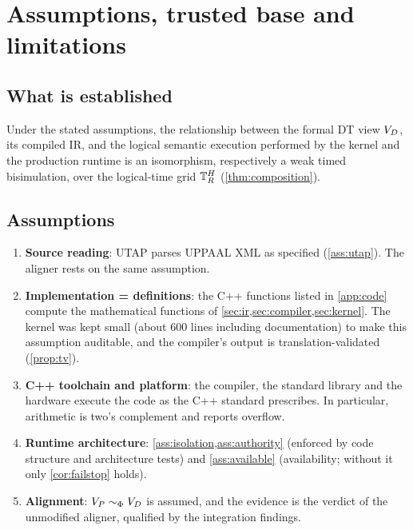 \section{Assumptions, trusted base and limitations}\label{sec:limitations}

\subsection{What is established}
Under the stated assumptions, the relationship between the formal DT view
$V_D$, its compiled IR, and the logical semantic execution performed by the
kernel and the production runtime is an isomorphism, respectively a weak
timed bisimulation, over the logical-time grid $\mathbb{T}_R^{H}$ (\cref{thm:composition}).

\subsection{Assumptions}
\begin{enumerate}[label=(A\arabic*)]
\item \textbf{Source reading}: UTAP parses UPPAAL XML as specified (\cref{ass:utap}).
  The aligner rests on the same assumption.
\item \textbf{Implementation = definitions}: the C++ functions listed in
  \cref{app:code} compute the mathematical functions of
  \cref{sec:ir,sec:compiler,sec:kernel}. The kernel was kept small (about 600
  lines including documentation) to make this assumption auditable, and the
  compiler's output is translation-validated (\cref{prop:tv}).
\item \textbf{C++ toolchain and platform}: the compiler, the standard library and
  the hardware execute the code as the C++ standard prescribes. In particular,
   arithmetic is two's complement and 
  reports overflow.
\item \textbf{Runtime architecture}: \cref{ass:isolation,ass:authority} (enforced by
  code structure and architecture tests) and \cref{ass:available} (availability;
  without it only \cref{cor:failstop} holds).
\item \textbf{Alignment}: $V_P\sim_{\Phi}V_D$ is assumed, and the evidence is the
  verdict of the unmodified aligner, qualified by the integration findings.
\end{enumerate}

